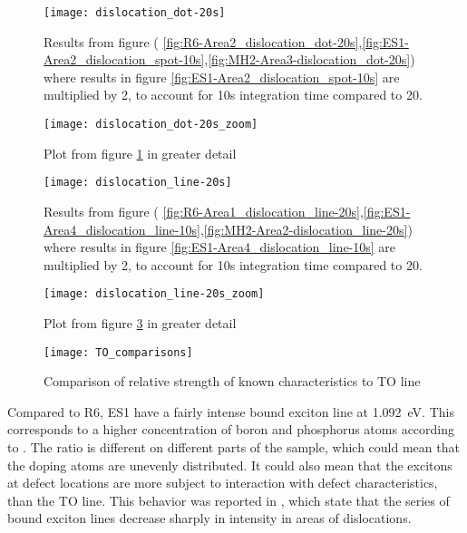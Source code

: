 \begin{figure}[H]
\centering
\texttt{[image: dislocation\_dot-20s]}
\caption[Comparisons in a dislocation dot]{Results from figure ( \ref{fig:R6-Area2_dislocation_dot-20s},\ref{fig:ES1-Area2_dislocation_spot-10s},\ref{fig:MH2-Area3-dislocation_dot-20s}) where results in figure \ref{fig:ES1-Area2_dislocation_spot-10s} are multiplied by 2, to account for 10s integration time compared to 20. }
\label{fig:dislocation_dot-20s_comparison}%
\end{figure}

\begin{figure}[H]
\centering
\texttt{[image: dislocation\_dot-20s\_zoom]}
\caption[Comparisons in a dislocation dot]{Plot from figure \ref{fig:dislocation_dot-20s_comparison} in greater detail}
\label{fig:dislocation_dot-20s_zoom_comparison}%
\end{figure}

\begin{figure}[H]
\centering
\texttt{[image: dislocation\_line-20s]}
\caption[Comparisons in a dislocation line]{Results from figure ( \ref{fig:R6-Area1_dislocation_line-20s},\ref{fig:ES1-Area4_dislocation_line-10s},\ref{fig:MH2-Area2-dislocation_line-20s}) where results in figure \ref{fig:ES1-Area4_dislocation_line-10s} are multiplied by 2, to account for 10s integration time compared to 20. }
\label{fig:dislocation_line-20s_comparison}%
\end{figure}


\begin{figure}[H]
\centering
\texttt{[image: dislocation\_line-20s\_zoom]}
\caption[Comparisons in a dislocation line]{Plot from figure \ref{fig:dislocation_line-20s_comparison} in greater detail}
\label{fig:dislocation_line-20s_zoom_comparison}%
\end{figure}

\begin{figure}[H]
\centering
\texttt{[image: TO\_comparisons]}
\caption[Comparison or relative strength]{Comparison of relative strength of known characteristics to TO line}
\label{fig:TO_comparisons}%
\end{figure}




Compared to R6, ES1 have a fairly intense bound exciton line at 1.092~eV. This corresponds to a higher concentration of boron and phosphorus atoms according to \cite{tajima78}. The ratio is different on different parts of the sample, which could mean that the doping atoms are unevenly distributed. It could also mean that the excitons at defect locations are more subject to interaction with defect characteristics, than the TO line. This behavior was reported in \cite{drozdov76}, which state that the series of bound exciton lines decrease sharply in intensity in areas of dislocations.